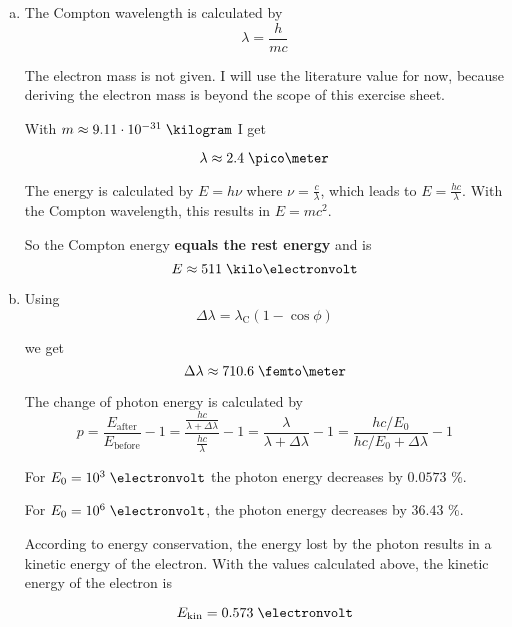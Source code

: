 \documentclass[a4paper,german,12pt,smallheadings]{scrartcl}
\begin{document}
\begin{enumerate}[a)]
  \item
    The Compton wavelength is calculated by
    \begin{equation*}
      \lambda = \frac{h}{mc}
    \end{equation*}

    The electron mass is not given. I will use the literature value for now,
    because deriving the electron mass is beyond the scope of this exercise
    sheet.

    With $m \approx 9.11 \cdot 10^{-31} \; \kilogram$ I get

    \begin{equation*}
      \lambda \approx 2.4 \; \pico\meter
    \end{equation*}

    The energy is calculated by $E = h \nu$ where $\nu = \frac{c}{\lambda}$,
    which leads to $E = \frac{hc}{\lambda}$. With the Compton wavelength, this
    results in $E=mc^2$.

    So the Compton energy \textbf{equals the rest energy} and is
    \begin{equation*}
      E \approx 511 \; \kilo\electronvolt
    \end{equation*}

  \item
    Using
    \begin{equation*}
      \Delta \lambda = \lambda_{\text{C}} \left( 1 - \cos \phi \right)
    \end{equation*}

    we get
    \begin{equation*}
      \Delta \lambda \approx 710.6 \; \femto\meter
    \end{equation*}

    The change of photon energy is calculated by
    \begin{equation*}
      p = \frac{E_\text{after}}{E_\text{before}} - 1 = \frac{\frac{hc}{\lambda + \Delta \lambda}}{\frac{hc}{\lambda}} - 1 = \frac{\lambda}{\lambda + \Delta \lambda} - 1
      = \frac{hc/E_0}{hc/E_0 + \Delta \lambda} - 1
    \end{equation*}

    For $E_0 = 10^3 \; \electronvolt$ the photon energy decreases by $0.0573$ \%.

    For $E_0 = 10^6 \; \electronvolt$, the photon energy decreases by $36.43$ \%.

    According to energy conservation, the energy lost by the photon results in
    a kinetic energy of the electron. With the values calculated above, the
    kinetic energy of the electron is

    \begin{equation*}
      E_\text{kin} = 0.573 \; \electronvolt
    \end{equation*}
\end{enumerate}
\end{document}
